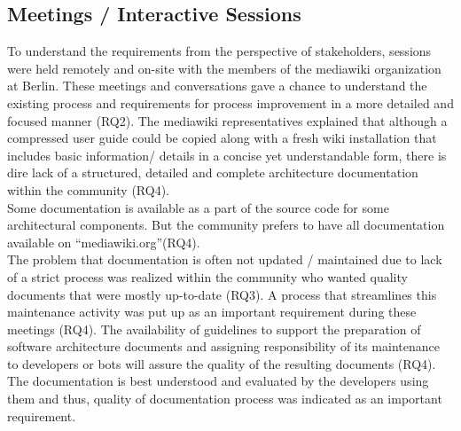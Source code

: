 \subsection{Meetings / Interactive Sessions}
\indent To understand the requirements from the perspective of stakeholders, sessions were held remotely and on-site with the members of the mediawiki organization at Berlin. These meetings and conversations gave a chance to understand the existing process and requirements for process improvement in a more detailed and focused manner (RQ2).
The mediawiki representatives explained that although a compressed user guide could be copied along with a fresh wiki installation that includes basic information/ details in a concise yet understandable form, there is dire lack of a structured, detailed and complete architecture documentation within the community (RQ4). 
\\\indent Some documentation is available as a part of the source code for some architectural components. But the community prefers to have all documentation available on \enquote{mediawiki.org}(RQ4).
\\\indent The problem that documentation is often not updated / maintained due to lack of a strict process was realized within the community who wanted quality documents that were mostly up-to-date (RQ3). A process that streamlines this maintenance activity was put up as an important requirement during these meetings (RQ4). 
\indent The availability of guidelines to support the preparation of software architecture documents and assigning responsibility of its maintenance to developers or bots will assure the quality of the resulting documents (RQ4). The documentation is best understood and evaluated by the developers using them and thus, quality of documentation process was indicated as an important requirement.
